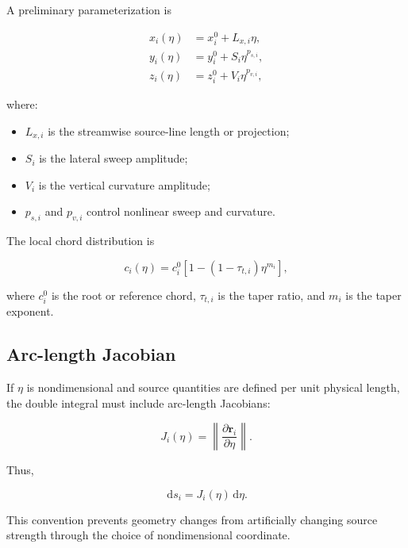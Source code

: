 \documentclass[11pt]{article}
\newcommand{\dd}{\,\mathrm{d}}
\newcommand{\vect}[1]{\bm{#1}}
\begin{document}
A preliminary parameterization is

\begin{align}
    x_i(\eta) &= x_i^0 + L_{x,i} \eta, \\
    y_i(\eta) &= y_i^0 + S_i \eta^{p_{s,i}}, \\
    z_i(\eta) &= z_i^0 + V_i \eta^{p_{v,i}},
\end{align}

where:

\begin{itemize}
    \item $L_{x,i}$ is the streamwise source-line length or projection;
    \item $S_i$ is the lateral sweep amplitude;
    \item $V_i$ is the vertical curvature amplitude;
    \item $p_{s,i}$ and $p_{v,i}$ control nonlinear sweep and curvature.
\end{itemize}

The local chord distribution is

\begin{equation}
    c_i(\eta)
    =
    c_i^0
    \left[
        1 -
        \left(1-\tau_{t,i}\right)\eta^{m_i}
    \right],
\end{equation}

where $c_i^0$ is the root or reference chord, $\tau_{t,i}$ is the taper ratio, and $m_i$ is the taper exponent.

\subsection{Arc-length Jacobian}

If $\eta$ is nondimensional and source quantities are defined per unit physical length, the double integral must include arc-length Jacobians:

\begin{equation}
    J_i(\eta)
    =
    \left\|
    \frac{\partial \vect{r}_i}{\partial \eta}
    \right\|.
\end{equation}

Thus,

\begin{equation}
    \dd s_i = J_i(\eta)\dd \eta.
\end{equation}

This convention prevents geometry changes from artificially changing source strength through the choice of nondimensional coordinate.
\end{document}
